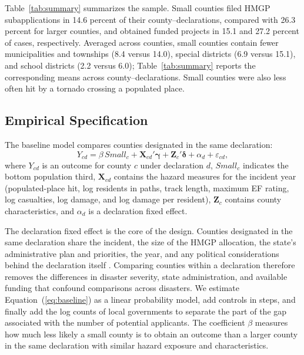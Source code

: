 Table~\ref{tab:summary} summarizes the sample. Small counties filed HMGP subapplications in 14.6 percent of their county--declarations, compared with 26.3 percent for larger counties, and obtained funded projects in 15.1 and 27.2 percent of cases, respectively. Averaged across counties, small counties contain fewer municipalities and townships (8.4 versus 14.0), special districts (6.9 versus 15.1), and school districts (2.2 versus 6.0); Table~\ref{tab:summary} reports the corresponding means across county--declarations. Small counties were also less often hit by a tornado crossing a populated place.

\subsection{Empirical Specification}

The baseline model compares counties designated in the same declaration:
\begin{equation}
Y_{cd} = \beta\, \mathit{Small}_c + \mathbf{X}_{cd}'\boldsymbol{\gamma} + \mathbf{Z}_c'\boldsymbol{\delta} + \alpha_d + \varepsilon_{cd},
\label{eq:baseline}
\end{equation}
where $Y_{cd}$ is an outcome for county $c$ under declaration $d$, $\mathit{Small}_c$ indicates the bottom population third, $\mathbf{X}_{cd}$ contains the hazard measures for the incident year (populated-place hit, log residents in paths, track length, maximum EF rating, log casualties, log damage, and log damage per resident), $\mathbf{Z}_c$ contains county characteristics, and $\alpha_d$ is a declaration fixed effect.

The declaration fixed effect is the core of the design. Counties designated in the same declaration share the incident, the size of the HMGP allocation, the state's administrative plan and priorities, the year, and any political considerations behind the declaration itself \parencite{garrett2003political,reeves2011political}. Comparing counties within a declaration therefore removes the differences in disaster severity, state administration, and available funding that confound comparisons across disasters. We estimate Equation~(\ref{eq:baseline}) as a linear probability model, add controls in steps, and finally add the log counts of local governments to separate the part of the gap associated with the number of potential applicants. The coefficient $\beta$ measures how much less likely a small county is to obtain an outcome than a larger county in the same declaration with similar hazard exposure and characteristics.

